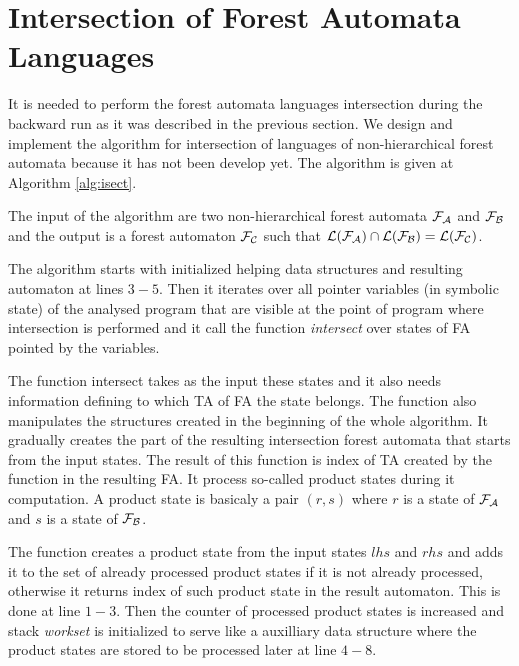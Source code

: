 \section{Intersection of Forest Automata Languages}

It is needed to perform the forest automata languages intersection
during the backward run as it was described in the previous section.
We design and implement the algorithm for intersection
of languages of non-hierarchical forest automata because it has not been develop yet.
The algorithm is given at Algorithm \ref{alg:isect}.

The input of the algorithm are two non-hierarchical forest automata $\mathcal{F}_{\mathcal{A}}$
and $\mathcal{F}_{\mathcal{B}}$ and the output is a forest automaton $\mathcal{F}_{\mathcal{C}}$ such that
$\mathcal{L}(\mathcal{F}_{\mathcal{A}}) \cap \mathcal{L}(\mathcal{F}_{\mathcal{B}}) = \mathcal{L}(\mathcal{F}_{\mathcal{C}})$.

The algorithm starts with initialized helping data structures and
resulting automaton at lines $3-5$.
Then it iterates over all pointer variables (in symbolic state) of the analysed program
that are visible at the point of program where intersection is performed
and it call the function \emph{intersect} over states of FA pointed
by the variables.

The function intersect takes as the input these states and
it also needs information defining to which TA of FA the state belongs.
The function also manipulates the structures created in the beginning of the
whole algorithm.
It gradually creates the part of the resulting intersection forest automata that starts
from the input states.
The result of this function is index of TA created by the function in the resulting FA.
It process so-called product states during it computation.
A product state is basicaly a pair $(r,s)$ where $r$ is a state of $\mathcal{F}_{\mathcal{A}}$
and $s$ is a state of $\mathcal{F}_{\mathcal{B}}$.

The function creates a product state from the input states $lhs$ and $rhs$ and
adds it to the set of already processed product states if it is not already processed,
otherwise it returns index of such product state in the result automaton.
This is done at line $1-3$.
Then the counter of processed product states is increased and
stack \emph{workset} is initialized to serve like a auxilliary data
structure where the product states are stored to be processed later at line $4-8$.

